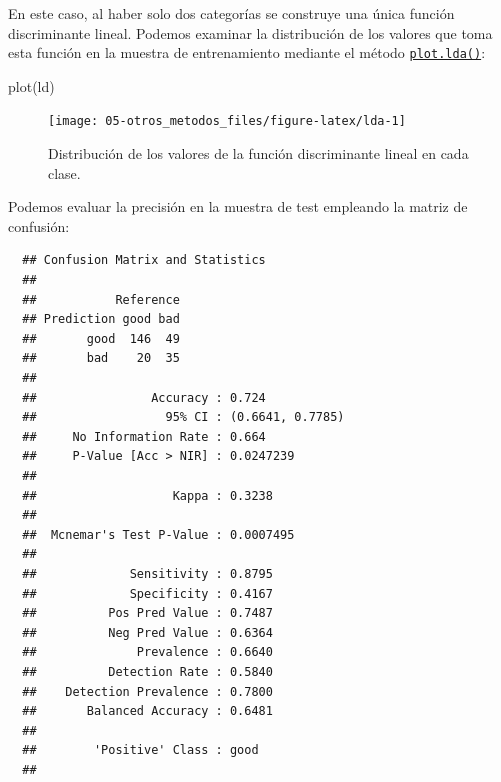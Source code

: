 \documentclass[
]{book}
\newenvironment{Shaded}{\begin{snugshade}}{\end{snugshade}}
\newcommand{\AttributeTok}[1]{\textcolor[rgb]{0.77,0.63,0.00}{#1}}
\newcommand{\FunctionTok}[1]{\textcolor[rgb]{0.00,0.00,0.00}{#1}}
\newcommand{\NormalTok}[1]{#1}
\newcommand{\OtherTok}[1]{\textcolor[rgb]{0.56,0.35,0.01}{#1}}
\newcommand{\SpecialCharTok}[1]{\textcolor[rgb]{0.00,0.00,0.00}{#1}}
\theoremstyle{break}
\theoremstyle{nonumberplain}
\begin{document}
En este caso, al haber solo dos categorías se construye una única función discriminante lineal.
Podemos examinar la distribución de los valores que toma esta función en la muestra de entrenamiento mediante el método \href{https://rdrr.io/pkg/MASS/man/plot.lda.html}{\texttt{plot.lda()}}:



\begin{Shaded}
\begin{Highlighting}[]
\FunctionTok{plot}\NormalTok{(ld)}
\end{Highlighting}
\end{Shaded}

\begin{figure}[!htb]

{\centering \texttt{[image: 05-otros\_metodos\_files/figure-latex/lda-1]} 

}

\caption{Distribución de los valores de la función discriminante lineal en cada clase.}\label{fig:lda}
\end{figure}

Podemos evaluar la precisión en la muestra de test empleando la matriz de confusión:

\begin{Shaded}
\end{Shaded}

\begin{verbatim}
  ## Confusion Matrix and Statistics
  ## 
  ##           Reference
  ## Prediction good bad
  ##       good  146  49
  ##       bad    20  35
  ##                                           
  ##                Accuracy : 0.724           
  ##                  95% CI : (0.6641, 0.7785)
  ##     No Information Rate : 0.664           
  ##     P-Value [Acc > NIR] : 0.0247239       
  ##                                           
  ##                   Kappa : 0.3238          
  ##                                           
  ##  Mcnemar's Test P-Value : 0.0007495       
  ##                                           
  ##             Sensitivity : 0.8795          
  ##             Specificity : 0.4167          
  ##          Pos Pred Value : 0.7487          
  ##          Neg Pred Value : 0.6364          
  ##              Prevalence : 0.6640          
  ##          Detection Rate : 0.5840          
  ##    Detection Prevalence : 0.7800          
  ##       Balanced Accuracy : 0.6481          
  ##                                           
  ##        'Positive' Class : good            
  ## 
\end{verbatim}
\end{document}
